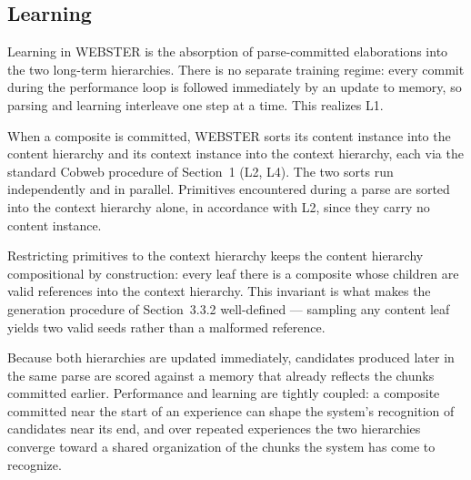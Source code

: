 \documentclass{article}
\begin{document}
\subsection{Learning}

Learning in WEBSTER is the absorption of parse-committed elaborations into the two long-term hierarchies. There is no separate training regime: every commit during the performance loop is followed immediately by an update to memory, so parsing and learning interleave one step at a time. This realizes L1.

When a composite is committed, WEBSTER sorts its content instance into the content hierarchy and its context instance into the context hierarchy, each via the standard Cobweb procedure of Section~1 (L2, L4). The two sorts run independently and in parallel. Primitives encountered during a parse are sorted into the context hierarchy alone, in accordance with L2, since they carry no content instance.

Restricting primitives to the context hierarchy keeps the content hierarchy compositional by construction: every leaf there is a composite whose children are valid references into the context hierarchy. This invariant is what makes the generation procedure of Section~3.3.2 well-defined --- sampling any content leaf yields two valid seeds rather than a malformed reference.

Because both hierarchies are updated immediately, candidates produced later in the same parse are scored against a memory that already reflects the chunks committed earlier. Performance and learning are tightly coupled: a composite committed near the start of an experience can shape the system's recognition of candidates near its end, and over repeated experiences the two hierarchies converge toward a shared organization of the chunks the system has come to recognize.
\end{document}
